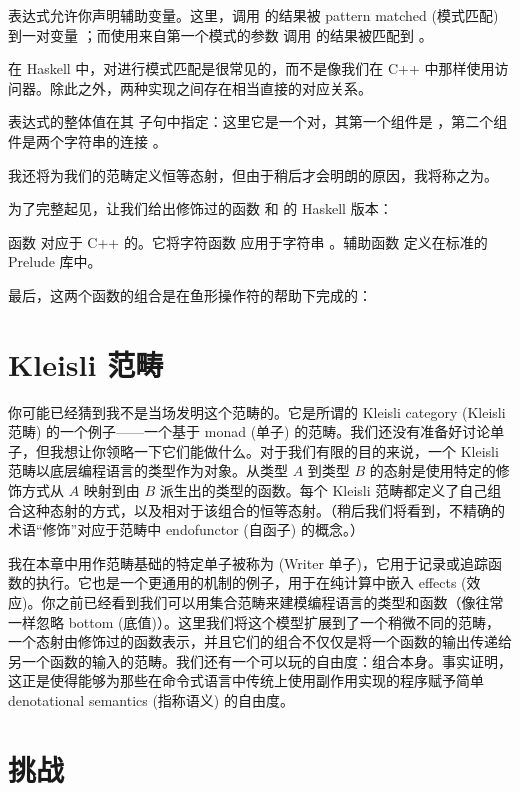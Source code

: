  表达式允许你声明辅助变量。这里，调用  的结果被 pattern matched (模式匹配) 到一对变量 ；而使用来自第一个模式的参数  调用  的结果被匹配到 。

在 Haskell 中，对进行模式匹配是很常见的，而不是像我们在 C++ 中那样使用访问器。除此之外，两种实现之间存在相当直接的对应关系。

 表达式的整体值在其  子句中指定：这里它是一个对，其第一个组件是 ，第二个组件是两个字符串的连接 。

我还将为我们的范畴定义恒等态射，但由于稍后才会明朗的原因，我将称之为。

为了完整起见，让我们给出修饰过的函数  和  的 Haskell 版本：

函数 对应于 C++ 的。它将字符函数 应用于字符串 。辅助函数\mbox{} 定义在标准的 Prelude 库中。

最后，这两个函数的组合是在鱼形操作符的帮助下完成的：


\section{Kleisli 范畴}

你可能已经猜到我不是当场发明这个范畴的。它是所谓的 Kleisli category (Kleisli 范畴) 的一个例子——一个基于 monad (单子) 的范畴。我们还没有准备好讨论单子，但我想让你领略一下它们能做什么。对于我们有限的目的来说，一个 Kleisli 范畴以底层编程语言的类型作为对象。从类型 $A$ 到类型 $B$ 的态射是使用特定的修饰方式从 $A$ 映射到由 $B$ 派生出的类型的函数。每个 Kleisli 范畴都定义了自己组合这种态射的方式，以及相对于该组合的恒等态射。（稍后我们将看到，不精确的术语“修饰”对应于范畴中 endofunctor (自函子) 的概念。）

我在本章中用作范畴基础的特定单子被称为  (Writer 单子)，它用于记录或追踪函数的执行。它也是一个更通用的机制的例子，用于在纯计算中嵌入 effects (效应)。你之前已经看到我们可以用集合范畴来建模编程语言的类型和函数（像往常一样忽略 bottom (底值)）。这里我们将这个模型扩展到了一个稍微不同的范畴，一个态射由修饰过的函数表示，并且它们的组合不仅仅是将一个函数的输出传递给另一个函数的输入的范畴。我们还有一个可以玩的自由度：组合本身。事实证明，这正是使得能够为那些在命令式语言中传统上使用副作用实现的程序赋予简单 denotational semantics (指称语义) 的自由度。

\section{挑战}

